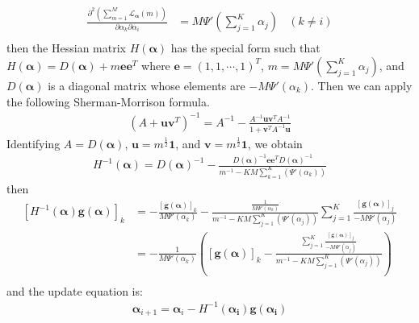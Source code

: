 \documentclass[a4]{article}
\begin{document}
\begin{equation}
\begin{aligned}
    \frac{ \partial^2 \left(\sum_{m=1}^M \mathcal{L}_{\bm{\alpha}}(m) \right) }
         { \partial\alpha_k \partial\alpha_i}
    &= M \Psi'( \sum_{j=1}^{K} \alpha_j )
    \:\:\:\:( k \ne i )\\
\end{aligned}
\end{equation}
then the Hessian matrix $H(\bm{\alpha})$ has the special form such that
$H(\bm{\alpha}) = D(\bm{\alpha}) + m\mathbf{e}\mathbf{e}^T$ where
$\mathbf{e} = (1,1, \cdots, 1)^T$, $m = M \Psi'( \sum_{j=1}^{K} \alpha_j )$, 
and $D(\bm{\alpha})$ is a diagonal matrix whose elements are 
$-M\Psi'(\alpha_k)$.
Then we can apply the following Sherman-Morrison formula.
\begin{equation}
\begin{aligned}
\left( A + \mathbf{u} \mathbf{v}^T \right)^{-1} 
=   A^{-1} - 
    \frac{ A^{-1} \mathbf{u} \mathbf{v}^T A^{-1} }
         { 1 + \mathbf{v}^T A^{-1} \mathbf{u} }
\end{aligned}
\end{equation}
Identifying $A = D(\bm{\alpha})$, $\mathbf{u} = m^{\frac{1}{2}}\mathbf{1}$, and
 $\mathbf{v} = m^{\frac{1}{2}}\mathbf{1}$, we obtain
\begin{equation}
\begin{aligned}
H^{-1}(\bm{\alpha}) = D(\bm{\alpha})^{-1} 
- \frac{ D(\bm{\alpha})^{-1} \mathbf{e}\mathbf{e}^T D(\bm{\alpha})^{-1} }
       { m^{-1} - KM \sum_{k=1}^K (\Psi'(\alpha_k)) }
\end{aligned}
\end{equation}
then
\begin{equation}
\begin{aligned}
\left[H^{-1}(\bm{\alpha})\mathbf{g}(\bm{\alpha})\right]_k&=
-\frac{[\mathbf{g}(\bm{\alpha})]_k}{M\Psi'(\alpha_k)}
-\frac{\frac{1}{M\Psi'(\alpha_k)}}
      {m^{-1} - KM\sum_{j=1}^{K}\left( \Psi'(\alpha_j) \right)}
 \sum_{j=1}^{K}\frac{[\mathbf{g}(\bm{\alpha})]_j}{-M\Psi'(\alpha_j)}\\
&=
-\frac{1}{M\Psi'(\alpha_k)}
\left(
[\mathbf{g}(\bm{\alpha})]_k
-
\frac{ \sum_{j=1}^K\frac{[\mathbf{g}(\bm{\alpha})]_j}{-M\Psi'(\alpha_j)} }
     { m^{-1} - KM\sum_{j=1}^{K}\left( \Psi'(\alpha_j) \right)}
\right)
\\
\end{aligned}
\end{equation}
and the update equation is:
\begin{equation}
\begin{aligned}
\bm{\alpha}_{i+1} = \bm{\alpha}_{i} - H^{-1}(\bm{\alpha_i})\mathbf{g}(\bm{\alpha_i})
\end{aligned}
\end{equation}
\end{document}
